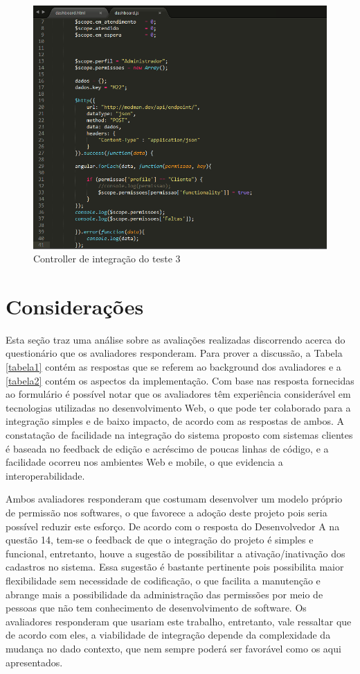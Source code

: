 \begin{figure}
	\includegraphics[width=1\textwidth]{images/controller_oficina.png}
	\caption{Controller de integração do teste 3}
    \label{fig:controller_oficina}
\end{figure}


\section{Considerações}\label{consideracoes}


Esta seção traz uma análise sobre as avaliações realizadas discorrendo acerca do questionário que os avaliadores responderam. Para prover a discussão, a Tabela \ref{tabela1} contém as respostas que se referem ao background dos avaliadores e a \ref{tabela2} contém os aspectos da implementação.
Com base nas resposta fornecidas ao formulário é possível notar que os avaliadores têm experiência considerável em tecnologias utilizadas no desenvolvimento Web, o que pode ter colaborado para a integração simples e de baixo impacto, de acordo com as respostas de ambos. A constatação de facilidade na integração do sistema proposto com sistemas clientes é baseada no feedback de edição e acréscimo de poucas linhas de código, e a facilidade ocorreu nos ambientes Web e mobile, o que evidencia a interoperabilidade.

Ambos avaliadores responderam que costumam desenvolver um modelo próprio de permissão nos softwares, o que favorece a adoção deste projeto pois seria possível reduzir este esforço.
De acordo com o resposta do Desenvolvedor A na questão 14, tem-se o feedback de que o integração do projeto é simples e funcional, entretanto, houve a sugestão de possibilitar a ativação/inativação dos cadastros no sistema. Essa sugestão é bastante pertinente pois possibilita maior flexibilidade sem necessidade de codificação, o que facilita a manutenção e abrange mais a possibilidade da administração das permissões por meio de pessoas que não tem conhecimento de desenvolvimento de software.
Os avaliadores responderam que usariam este trabalho, entretanto, vale ressaltar que de acordo com eles, a viabilidade de integração depende da complexidade da mudança no dado contexto, que nem sempre poderá ser favorável como os aqui apresentados.

